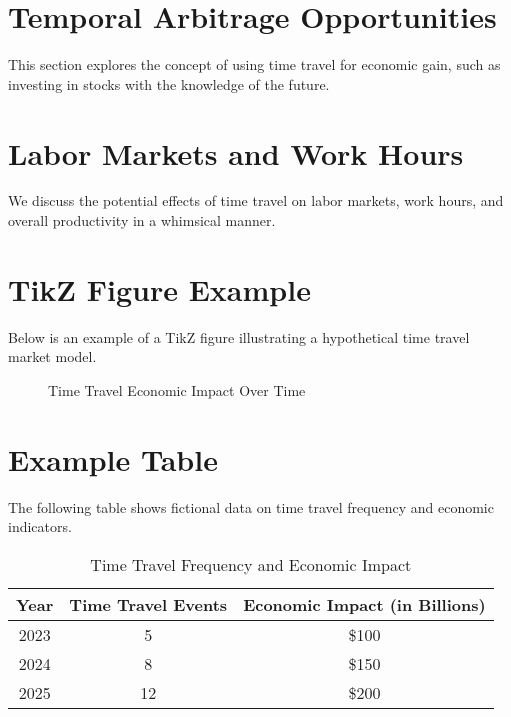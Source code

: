 \documentclass[11pt,a4paper]{article}
\begin{document}
\section{Temporal Arbitrage Opportunities}
This section explores the concept of using time travel for economic gain, such as investing in stocks with the knowledge of the future.

\section{Labor Markets and Work Hours}
We discuss the potential effects of time travel on labor markets, work hours, and overall productivity in a whimsical manner.


\section{TikZ Figure Example}
Below is an example of a TikZ figure illustrating a hypothetical time travel market model.

\begin{figure}[H]
\centering
{}
\caption{Time Travel Economic Impact Over Time}
\end{figure}


\section{Example Table}
The following table shows fictional data on time travel frequency and economic indicators.

\begin{table}[H]
\centering
\begin{tabular}{|c|c|c|}
\hline
Year & Time Travel Events & Economic Impact (in Billions) \\
\hline
2023 & 5 & \$100 \\
2024 & 8 & \$150 \\
2025 & 12 & \$200 \\
\hline
\end{tabular}
\caption{Time Travel Frequency and Economic Impact}
\end{table}
\end{document}
